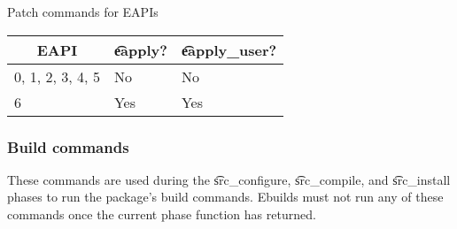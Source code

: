 \begin{centertable}{Patch commands for EAPIs}
    \label{tab:patch-commands}
    \begin{tabular}{lll}
      \toprule
      \multicolumn{1}{c}{\textbf{EAPI}} &
      \multicolumn{1}{c}{\textbf{\t{eapply}?}} &
      \multicolumn{1}{c}{\textbf{\t{eapply\_user}?}} \\
      \midrule
      0, 1, 2, 3, 4, 5  & No  & No  \\
      6                 & Yes & Yes \\
      \bottomrule
    \end{tabular}
\end{centertable}

\subsubsection{Build commands}
These commands are used during the \t{src\_configure}, \t{src\_compile}, and \t{src\_install}
phases to run the package's build commands. Ebuilds must not run any of these commands once the
current phase function has returned.

